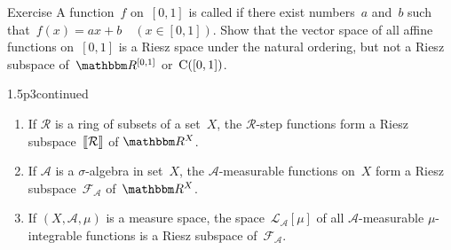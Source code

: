 \documentclass[main.tex]{subfiles}
\begin{document}
%
%
\begin{psec}{1.7}{Exercise}
A function~$f$ on~$[0,1]$ is called 
if there exist numbers~$a$ and~$b$ 
such that~$f(x)=ax+b\quad (x\in[0,1])$.
Show that the vector space of all affine functions on~$[0,1]$
is a Riesz space under the natural ordering,
but not a Riesz subspace of~$\R^{[0,1]}$ or~$\mathrm{C}([0,1])$.
\end{psec}
%
%
\begin{psec}[1.5]{1.5p3}{continued}
\begin{enumerate}
\setcounter{enumi}{\value{list-1.5}}
\item
\label{1.5-7}
If $\mathcal{R}$ is a ring of subsets of a set~$X$,
the $\mathcal{R}$-step functions form a 
Riesz subspace~$\lbb \mathcal{R} \rbb$ of $\R^X$.
%
\item
\label{1.5-8}
If $\mathcal{A}$ is a $\sigma$-algebra 
in set~$X$,
the $\mathcal A$-measurable functions on~$X$
form a Riesz subspace~$\mathcal F_{\mathcal A}$ of~$\R^X$.
%
\item
\label{1.5-9}
If $(X,\mathcal A,\mu)$ is a measure space,
the space~$\mathcal L_{\mathcal A}[\mu]$
of all $\mathcal A$-measurable 
$\mu$-integrable functions is a Riesz subspace
of~$\mathcal F_{\mathcal A}$.
\end{enumerate}
\end{psec}
%
%
\end{document}
